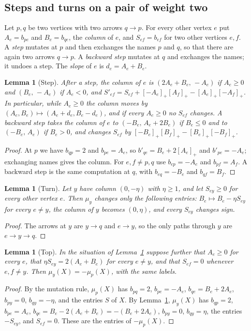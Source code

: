 \documentclass[11pt]{amsart}
\newtheorem{lemma}[theorem]{Lemma}
\theoremstyle{definition}
\theoremstyle{remark}
\newcommand{\pos}[1]{[#1]_+}
\begin{document}
\subsection{Steps and turns on a pair of weight two}\label{sec:steps}
Let $p,q$ be two vertices with two arrows $q\to p$. For every other vertex $e$ put $A_e=b_{pe}$ and $B_e=b_{qe}$, the \emph{column} of $e$, and $S_{ef}=b_{ef}$ for two other vertices $e,f$. A \emph{step} mutates at $p$ and then exchanges the names $p$ and $q$, so that there are again two arrows $q\to p$. A \emph{backward step} mutates at $q$ and exchanges the names; it undoes a step. The \emph{slope} of $e$ is $d_e=A_e+B_e$.

\begin{lemma}[Step]\label{lem:step}
After a step, the column of $e$ is $(2A_e+B_e,\,-A_e)$ if $A_e\ge0$ and $(B_e,\,-A_e)$ if $A_e<0$, and $S'_{ef}=S_{ef}+\pos{-A_e}\pos{A_f}-\pos{A_e}\pos{-A_f}$. In particular, while $A_e\ge0$ the column moves by $(A_e,B_e)\mapsto(A_e+d_e,B_e-d_e)$, and if every $A_e\ge0$ no $S_{ef}$ changes. A backward step takes the column of $e$ to $(-B_e,\,A_e+2B_e)$ if $B_e\le0$ and to $(-B_e,\,A_e)$ if $B_e>0$, and changes $S_{ef}$ by $\pos{-B_e}\pos{B_f}-\pos{B_e}\pos{-B_f}$.
\end{lemma}
\begin{proof}
At $p$ we have $b_{qp}=2$ and $b_{pe}=A_e$, so $b'_{qe}=B_e+2\pos{A_e}$ and $b'_{pe}=-A_e$; exchanging names gives the column. For $e,f\neq p,q$ use $b_{ep}=-A_e$ and $b_{pf}=A_f$. A backward step is the same computation at $q$, with $b_{eq}=-B_e$ and $b_{qf}=B_f$.
\end{proof}

\begin{lemma}[Turn]\label{lem:turn}
Let $y$ have column $(0,-\eta)$ with $\eta\ge1$, and let $S_{ey}\ge0$ for every other vertex $e$. Then $\mu_y$ changes only the following entries: $B_e\mapsto B_e-\eta S_{ey}$ for every $e\ne y$, the column of $y$ becomes $(0,\eta)$, and every $S_{ey}$ changes sign.
\end{lemma}
\begin{proof}
The arrows at $y$ are $y\to q$ and $e\to y$, so the only paths through $y$ are $e\to y\to q$.
\end{proof}

\begin{lemma}[Top]\label{lem:top}
In the situation of Lemma~\ref{lem:turn} suppose further that $A_e\ge0$ for every $e$, that $\eta S_{ey}=2(A_e+B_e)$ for every $e\ne y$, and that $S_{ef}=0$ whenever $e,f\ne y$. Then $\mu_y(X)=-\mu_p(X)$, with the same labels.
\end{lemma}
\begin{proof}
By the mutation rule, $\mu_p(X)$ has $b_{pq}=2$, $b_{pe}=-A_e$, $b_{qe}=B_e+2A_e$, $b_{py}=0$, $b_{qy}=-\eta$, and the entries $S$ of $X$. By Lemma~\ref{lem:turn}, $\mu_y(X)$ has $b_{qp}=2$, $b_{pe}=A_e$, $b_{qe}=B_e-2(A_e+B_e)=-(B_e+2A_e)$, $b_{py}=0$, $b_{qy}=\eta$, the entries $-S_{ey}$, and $S_{ef}=0$. These are the entries of $-\mu_p(X)$.
\end{proof}
\end{document}
